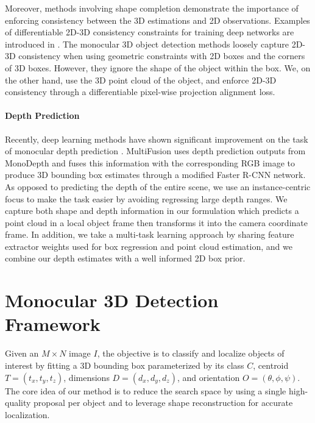 \documentclass[10pt,twocolumn,letterpaper]{article}
\begin{document}
	Moreover, methods involving shape completion \cite{dai2017shape, firman2016structured, rock2015completing} demonstrate the importance of enforcing consistency between the 3D estimations and 2D observations. Examples of differentiable 2D-3D consistency constraints for training deep networks are introduced in \cite{rezende2016unsupervised, tulsiani2017multi, wu2017marrnet, wu2016single, yan2016perspective}. The monocular 3D object detection methods \cite{lindernoren, mousavian_deep3dbox} loosely capture 2D-3D consistency when using geometric constraints with 2D boxes and the corners of 3D boxes. However, they ignore the shape of the object within the box. We, on the other hand, use the 3D point cloud of the object, and enforce 2D-3D consistency through a differentiable pixel-wise projection alignment loss.
	
	\paragraph{Depth Prediction}
	Recently, deep learning methods have shown significant improvement on the task of monocular depth prediction \cite{fu2018dorn, godard, kuznietsov2017semi}. MultiFusion \cite{xu_multifusion} uses depth prediction outputs from MonoDepth \cite{godard} and fuses this information with the corresponding RGB image to produce 3D bounding box estimates through a modified Faster R-CNN network. As opposed to predicting the depth of the entire scene, we use an instance-centric focus to make the task easier by avoiding regressing large depth ranges. We capture both shape and depth information in our formulation which predicts a point cloud in a local object frame then transforms it into the camera coordinate frame. In addition, we take a multi-task learning approach by sharing feature extractor weights used for box regression and point cloud estimation, and we combine our depth estimates with a well informed 2D box prior.
	
	\section{Monocular 3D Detection Framework}
	Given an $M \times N$ image $I$, the objective is to classify and localize objects of interest by fitting a 3D bounding box parameterized by its class $C$, centroid $T = (t_x, t_y, t_z)$, dimensions $D = (d_x, d_y, d_z)$, and orientation $O = (\theta, \phi, \psi)$. The core idea of our method is to reduce the search space by using a single high-quality proposal per object and to leverage shape reconstruction for accurate localization.
	
\end{document}
